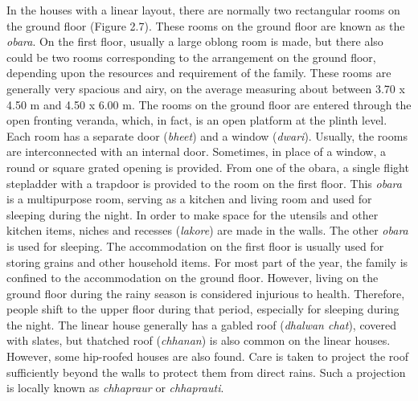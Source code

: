 In the houses with a linear layout, there are normally two rectangular rooms on the ground floor (Figure 2.7). These rooms on the ground floor are known as the \textit{obara}. On the first floor, usually a large oblong room is made, but there also could be two rooms corresponding to the arrangement on the ground floor, depending upon the resources and requirement of the family. These rooms are generally very spacious and airy, on the average measuring about between 3.70 x 4.50 m and 4.50 x 6.00 m. The rooms on the ground floor are entered through the open fronting veranda, which, in fact, is an open platform at the plinth level. Each room has a separate door (\textit{bheet}) and a window (\textit{dwari}). Usually, the rooms are interconnected with an internal door. Sometimes, in place of a window, a round or square grated opening is provided. From one of the obara, a single flight stepladder with a trapdoor is provided to the room on the first floor. This \textit{obara} is a multipurpose room, serving as a kitchen and living room and used for sleeping during the night. In order to make space for the utensils and other kitchen items, niches and recesses (\textit{lakore}) are made in the walls. The other \textit{obara} is used for sleeping. The accommodation on the first floor is usually used for storing grains and other household items. For most part of the year, the family is confined to the accommodation on the ground floor. However, living on the ground floor during the rainy season is considered injurious to health. Therefore, people shift to the upper floor during that period, especially for sleeping during the night. The linear house generally has a gabled roof (\textit{dhalwan chat}), covered with slates, but thatched roof (\textit{chhanan}) is also common on the linear houses. However, some hip-roofed houses are also found. Care is taken to project the roof sufficiently beyond the walls to protect them from direct rains. Such a projection is locally known as \textit{chhapraur} or \textit{chhaprauti}.

